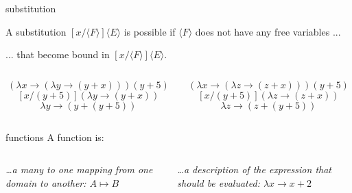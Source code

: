 \begin{frame}{substitution}
  

A substitution $[x/\langle F \rangle]\langle E \rangle$ is possible if
$\langle F \rangle$ does not have any free variables ...
\pause

\vspace{5pt}\hspace{40pt} ... that become bound in $[x/\langle F \rangle]\langle E \rangle$.

\pause\vspace{20pt}

\begin{columns}
 \begin{column}{0.5\linewidth}
$$(\lambda x \rightarrow (\lambda y \rightarrow  (y + x))) (y + 5)$$
\pause
$$[x/(y + 5)] (\lambda y \rightarrow  (y + x))$$
\pause
$$\lambda y \rightarrow  (y + (y + 5))$$
 \end{column}

\pause
 \begin{column}{0.5\linewidth}
$$(\lambda x \rightarrow (\lambda z \rightarrow  (z + x))) (y + 5)$$
\pause
$$[x/(y + 5)] (\lambda z \rightarrow  (z + x))$$
\pause
$$\lambda z \rightarrow  (z + (y + 5))$$
 \end{column}

\end{columns}

\pause

\vspace{20pt}{\em We have to be careful but renaming variables solves the problem.}


\end{frame}



\begin{frame}{functions}
  A function is:
 \vspace{40pt}
 \begin{columns}[t]
      \begin{column}{0.5\textwidth}
        {\em \ldots a many to one mapping from one domain to another:  $A \mapsto B$ }
      \end{column}
      \begin{column}{0.5\textwidth}
        {\em \ldots a description of the expression that should be evaluated: $\lambda x \rightarrow x + 2$}
      \end{column}
   \end{columns}

\vspace{40pt}{\em In mathematics we can work with functions even if we do not know how to compute them.}


\end{frame}


